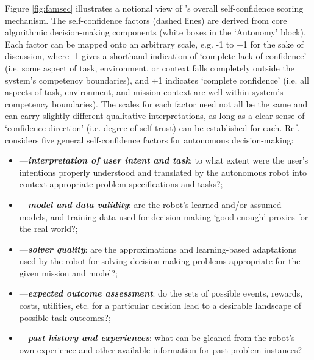 Figure \ref{fig:famsec} illustrates a notional view of \famsec's overall self-confidence scoring mechanism. The self-confidence factors (dashed lines) are derived from core algorithmic decision-making components (white boxes in the `Autonomy' block).  
Each factor can be mapped onto an arbitrary scale, e.g. -1 to +1 for the sake of discussion, where -1 gives a shorthand indication of `complete lack of confidence' (i.e. some aspect of task, environment, or context falls completely outside the system's competency boundaries), and +1 indicates `complete confidence' (i.e. all aspects of task, environment, and mission context are well within system's competency boundaries). 
The scales for each factor need not all be the same and can carry slightly different qualitative interpretations, as long as a clear sense of `confidence direction' (i.e. degree of self-trust) can be established for each. Ref. \cite{Aitken2016-cv} considers five general self-confidence factors for autonomous decision-making: %
\begin{itemize}
    \item \xI---\textit{\textbf{interpretation of user intent and task}}: to what extent were the user's intentions properly understood and translated by the autonomous robot into context-appropriate problem specifications and tasks?; 
    \item \xM---\textit{\textbf{model and data validity}}: are the robot's learned and/or assumed models, and training data used for decision-making `good enough' proxies for the real world?; 
    \item \xQ---\textit{\textbf{solver quality}}: are the approximations and learning-based adaptations used by the robot for solving decision-making problems appropriate for the given mission and model?; 
    \item \xO---\textit{\textbf{expected outcome assessment}}: do the sets of possible events, rewards, costs, utilities, etc. for a particular decision lead to a desirable landscape of possible task outcomes?; 
    \item \xP---\textit{\textbf{past history and experiences}}: what can be gleaned from the robot's own experience and other available information for past problem instances? %
\end{itemize}

